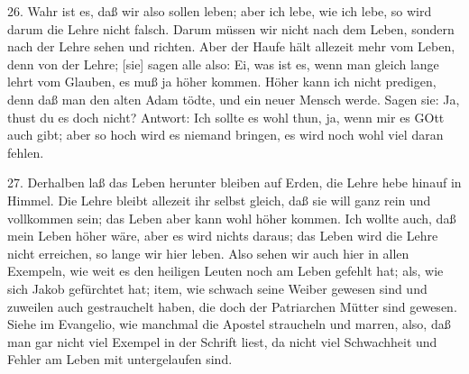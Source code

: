 26. Wahr ist es, daß wir also sollen leben; aber ich lebe, wie ich lebe, so wird darum die Lehre nicht falsch. Darum müssen wir nicht nach dem Leben, sondern nach der Lehre sehen und richten. Aber der Haufe hält allezeit mehr vom Leben, denn von der Lehre; [sie] sagen alle also: Ei, was ist es, wenn man gleich lange lehrt vom Glauben, es muß ja höher kommen. Höher kann ich nicht predigen, denn daß man den alten Adam tödte, und ein neuer Mensch werde. Sagen sie: Ja, thust du es doch nicht? Antwort: Ich sollte es wohl thun, ja, wenn mir es GOtt auch gibt; aber so hoch wird es niemand bringen, es wird noch wohl viel daran fehlen.

27. Derhalben laß das Leben herunter bleiben auf Erden, die Lehre hebe hinauf in Himmel. Die Lehre bleibt allezeit ihr selbst gleich, daß sie will ganz rein und vollkommen sein; das Leben aber kann wohl höher kommen. Ich wollte auch, daß mein Leben höher wäre, aber es wird nichts daraus; das Leben wird die Lehre nicht erreichen, so lange wir hier leben. Also sehen wir auch hier in allen Exempeln, wie weit es den heiligen Leuten noch am Leben gefehlt hat; als, wie sich Jakob gefürchtet hat; item, wie schwach seine Weiber gewesen sind und zuweilen auch gestrauchelt haben, die doch der Patriarchen Mütter sind gewesen. Siehe im Evangelio, wie manchmal die Apostel straucheln und marren, also, daß man gar nicht viel Exempel in der Schrift liest, da nicht viel Schwachheit und Fehler am Leben mit untergelaufen sind.

